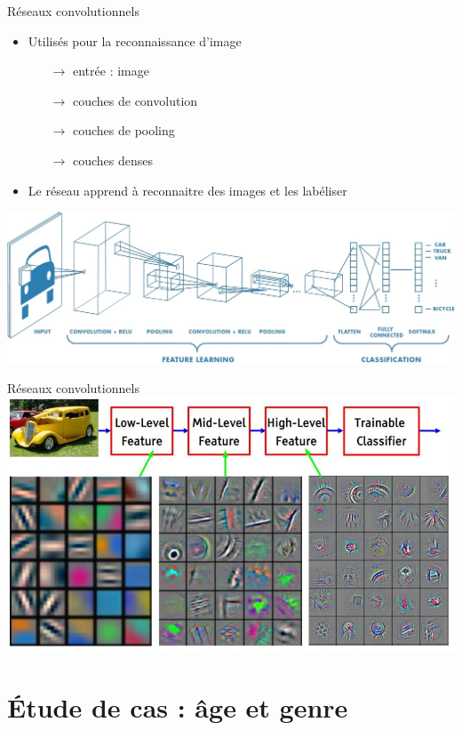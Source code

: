 \documentclass[compress]{beamer}
\begin{document}
\begin{frame}{Réseaux convolutionnels}
	\begin{itemize}
		\item Utilisés pour la reconnaissance d'image
		\begin{itemize}
			\item[$\rightarrow$] entrée : image
			\item[$\rightarrow$] couches de convolution
			\item[$\rightarrow$] couches de pooling
			\item[$\rightarrow$] couches denses
		\end{itemize}
		\item Le réseau apprend à reconnaitre des images et les labéliser
	\end{itemize}	
	\centering
	\includegraphics[width=1\linewidth]{resources/clem/convolutional_netowrk}
\end{frame}

\begin{frame}{Réseaux convolutionnels}	
	\centering
	\includegraphics[width=1\linewidth]{resources/clem/features}
\end{frame}

\section{\'Etude de cas : âge et genre}
\end{document}
